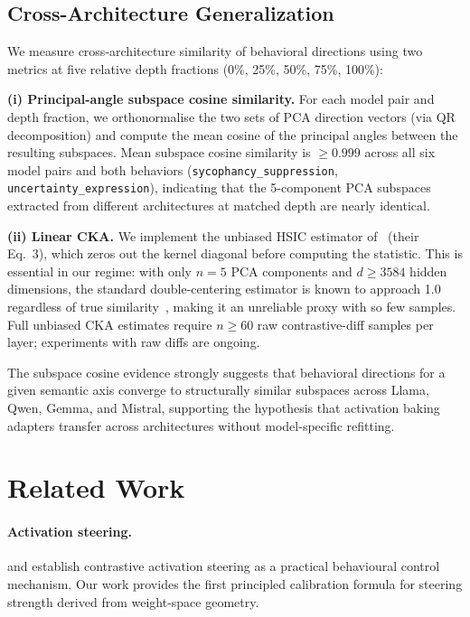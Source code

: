 \documentclass{article}
\begin{document}
\subsection{Cross-Architecture Generalization}
\label{sec:exp_cka}

We measure cross-architecture similarity of behavioral directions using two metrics
at five relative depth fractions (0\%, 25\%, 50\%, 75\%, 100\%):

\textbf{(i) Principal-angle subspace cosine similarity.}
For each model pair and depth fraction, we orthonormalise the two sets of PCA
direction vectors (via QR decomposition) and compute the mean cosine of the
principal angles between the resulting subspaces.
Mean subspace cosine similarity is $\geq 0.999$ across all six model pairs and both
behaviors (\texttt{sycophancy\_suppression}, \texttt{uncertainty\_expression}),
indicating that the 5-component PCA subspaces extracted from different architectures
at matched depth are nearly identical.

\textbf{(ii) Linear CKA.}
We implement the unbiased HSIC estimator of~\citet{kornblith2019similarity} (their
Eq.~3), which zeros out the kernel diagonal before computing the statistic.
This is essential in our regime: with only $n=5$ PCA components and $d \geq 3584$
hidden dimensions, the standard double-centering estimator is known to approach 1.0
regardless of true similarity~\cite{kornblith2019similarity}, making it an unreliable
proxy with so few samples.
Full unbiased CKA estimates require $n \geq 60$ raw contrastive-diff samples per layer;
experiments with raw diffs are ongoing.

The subspace cosine evidence strongly suggests that behavioral directions for a given
semantic axis converge to structurally similar subspaces across Llama, Qwen, Gemma,
and Mistral, supporting the hypothesis that activation baking adapters transfer across
architectures without model-specific refitting.

\section{Related Work}
\label{sec:related}

\paragraph{Activation steering.}
\citet{turner2023activation} and \citet{rimsky2024contrastive} establish contrastive
activation steering as a practical behavioural control mechanism.
Our work provides the first principled calibration formula for steering strength
derived from weight-space geometry.
\end{document}
